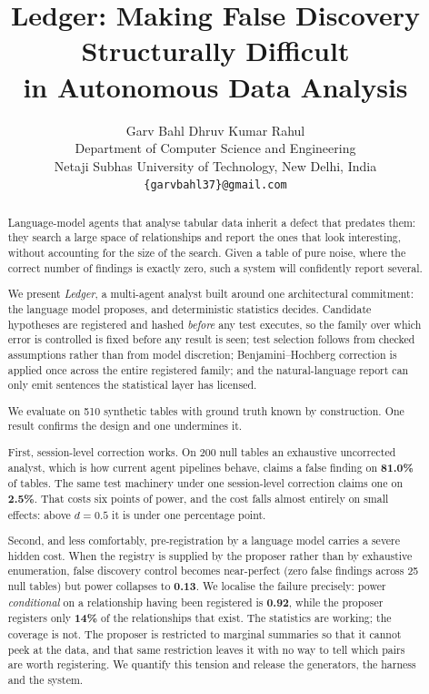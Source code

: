 \documentclass[10pt,twocolumn]{article}
\title{\vspace{-6mm}\textbf{Ledger: Making False Discovery Structurally Difficult\\ in Autonomous Data Analysis}\vspace{-2mm}}
\author{
Garv Bahl \quad Dhruv Kumar \quad Rahul\\
\small Department of Computer Science and Engineering\\
\small Netaji Subhas University of Technology, New Delhi, India\\
\small \texttt{\{garvbahl37\}@gmail.com}
\vspace{-4mm}
}
\date{}
\begin{document}
\maketitle

\begin{abstract}
\noindent
Language-model agents that analyse tabular data inherit a defect that predates
them: they search a large space of relationships and report the ones that look
interesting, without accounting for the size of the search. Given a table of
pure noise, where the correct number of findings is exactly zero, such a system
will confidently report several.

We present \emph{Ledger}, a multi-agent analyst built around one architectural
commitment: the language model proposes, and deterministic statistics decides.
Candidate hypotheses are registered and hashed \emph{before} any test executes,
so the family over which error is controlled is fixed before any result is seen;
test selection follows from checked assumptions rather than from model
discretion; Benjamini--Hochberg correction is applied once across the entire
registered family; and the natural-language report can only emit sentences the
statistical layer has licensed.

We evaluate on 510 synthetic tables with ground truth known by construction.
One result confirms the design and one undermines it.

First, session-level correction works. On 200 null tables an exhaustive
uncorrected analyst, which is how current agent pipelines behave, claims a false
finding on \textbf{81.0\%} of tables. The same test machinery under one
session-level correction claims one on \textbf{2.5\%}. That costs six points of
power, and the cost falls almost entirely on small effects: above $d = 0.5$ it
is under one percentage point.

Second, and less comfortably, pre-registration by a language model carries a
severe hidden cost. When the registry is supplied by the proposer rather than by
exhaustive enumeration, false discovery control becomes near-perfect (zero false
findings across 25 null tables) but power collapses to \textbf{0.13}. We localise
the failure precisely: power \emph{conditional} on a relationship having been
registered is \textbf{0.92}, while the proposer registers only \textbf{14\%} of
the relationships that exist. The statistics are working; the coverage is not.
The proposer is restricted to marginal summaries so that it cannot peek at the
data, and that same restriction leaves it with no way to tell which pairs are
worth registering. We quantify this tension and release the generators, the
harness and the system.
\end{abstract}
\end{document}

